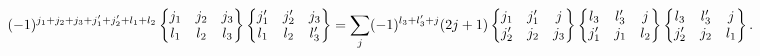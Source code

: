 \[(-1)^{j_{1}+j_{2}+j_{3}+j_{1}^{\prime}+j_{2}^{\prime}+l_{1}+l_{2}}\begin{%
Bmatrix}j_{1}&j_{2}&j_{3}\\
l_{1}&l_{2}&l_{3}\end{Bmatrix}\begin{Bmatrix}j_{1}^{\prime}&j_{2}^{\prime}&j_{%
3}\\
l_{1}&l_{2}&l_{3}^{\prime}\end{Bmatrix}=\sum_{j}(-1)^{l_{3}+l_{3}^{\prime}+j}(%
2j+1)\begin{Bmatrix}j_{1}&j_{1}^{\prime}&j\\
j_{2}^{\prime}&j_{2}&j_{3}\end{Bmatrix}\begin{Bmatrix}l_{3}&l_{3}^{\prime}&j\\
j_{1}^{\prime}&j_{1}&l_{2}\end{Bmatrix}\begin{Bmatrix}l_{3}&l_{3}^{\prime}&j\\
j_{2}^{\prime}&j_{2}&l_{1}\end{Bmatrix}.\]